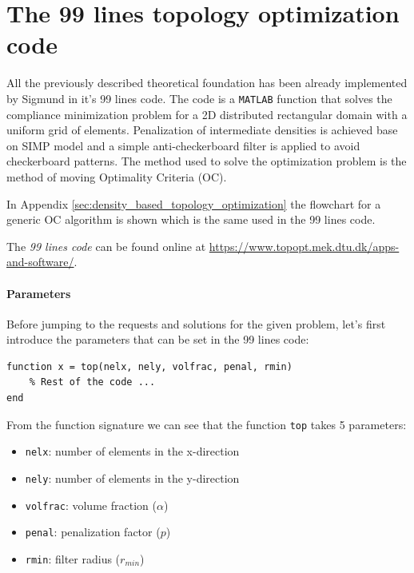 \section{The 99 lines topology optimization code}
\label{sec:99_lines_code}

All the previously described theoretical foundation has been already implemented by Sigmund \cite{Sigmund2001} in it's 99 lines code.
The code is a \texttt{MATLAB} function that solves the compliance minimization problem for a 2D distributed rectangular domain with a uniform grid of elements.
Penalization of intermediate densities is achieved base on SIMP model and a simple anti-checkerboard filter is applied to avoid checkerboard patterns.
The method used to solve the optimization problem is the method of moving Optimality Criteria (OC).

In Appendix \ref{sec:density_based_topology_optimization} the flowchart for a generic OC algorithm is shown which is the same used in the 99 lines code.

The \textit{99 lines code} can be found online at \url{https://www.topopt.mek.dtu.dk/apps-and-software/}.


\paragraph{Parameters}

Before jumping to the requests and solutions for the given problem, let's first introduce the parameters that can be set in the 99 lines code:

\begin{lstlisting}[style=Matlab-editor]
function x = top(nelx, nely, volfrac, penal, rmin)
    % Rest of the code ...
end
\end{lstlisting}

From the function signature we can see that the function \texttt{top} takes 5 parameters:

\begin{itemize}
    \item \texttt{nelx}: number of elements in the x-direction
    \item \texttt{nely}: number of elements in the y-direction
    \item \texttt{volfrac}: volume fraction ($\alpha$)
    \item \texttt{penal}: penalization factor ($p$)
    \item \texttt{rmin}: filter radius ($r_{min}$)
\end{itemize}